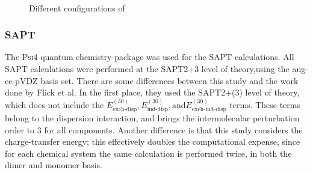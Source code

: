 \begin{figure}
    \centering
    \mbox{
    }
    \mbox{
    }                                 
    \mbox{                            
    }
    \caption{Different configurations of \protect{} \label{fig:conf-c2mpyr-ntf2}}
\end{figure}



\subsubsection{SAPT}

The \textsc{Psi4} quantum chemistry package was used for the SAPT calculations. 
\cite{Turney2012}
All SAPT calculations were performed at the SAPT2+3 level of theory,using the aug-cc-pVDZ basis set.
There are some differences between this study and the work done by Flick et al. 
In the first place, they used the SAPT2+(3) level of theory, which does not include the 
$E^{(30)}_{\text{exch-disp}}, E^{(30)}_{\text{ind-disp}}, \text{and}  E^{(30)}_{\text{exch-ind-disp}}$ 
terms. 
These terms belong to the dispersion interaction, and brings the intermolecular perturbation order to 3 for all components.
Another difference is that this study considers the charge-transfer energy; this effectively doubles the computational expense, since for each chemical system the same calculation is performed twice, in both the dimer and monomer basis.

